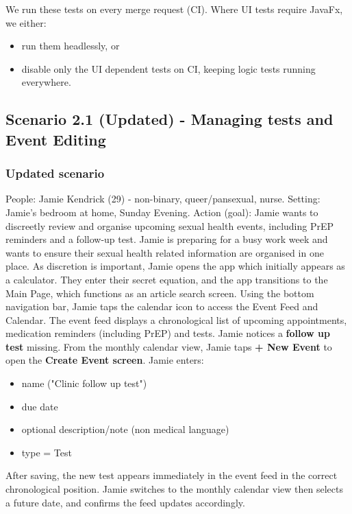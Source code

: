 \documentclass[a4paper,12pt]{article}
\begin{document}
We run these tests on every merge request (CI). Where UI tests require JavaFx, we either:
\begin{itemize}
    \item run them headlessly, or
    \item disable only the UI dependent tests on CI, keeping logic tests running everywhere.
\end{itemize}

\subsection{Scenario 2.1 (Updated) - Managing tests and Event Editing}

\subsubsection{Updated scenario}

People: Jamie Kendrick (29) - non-binary, queer/pansexual, nurse.
Setting: Jamie’s bedroom at home, Sunday Evening.
Action (goal): Jamie wants to discreetly review and organise upcoming sexual health events,
including PrEP reminders and a follow-up test.
Jamie is preparing for a busy work week and wants to ensure their sexual health related information
are organised in one place. As discretion is important, Jamie opens the app which initially appears
as a calculator. They enter their secret equation, and the app transitions to the Main Page,
which functions as an article search screen.
Using the bottom navigation bar, Jamie taps the calendar icon to access the Event Feed
and Calendar. The event feed displays a chronological list of upcoming appointments, medication
reminders (including PrEP) and tests.  Jamie notices a \textbf{follow up test} missing. From the monthly calendar view, Jamie taps \textbf{+ New Event}
to open the \textbf{Create Event screen}. Jamie enters:
\begin{itemize}
    \item name ("Clinic follow up test")
    \item due date
    \item optional description/note (non medical language)
    \item type = Test
\end{itemize} After saving, the new test appears immediately
in the event feed in the correct chronological position.
Jamie switches to the monthly calendar view then selects a future date, and confirms the feed
updates accordingly. 
\end{document}
